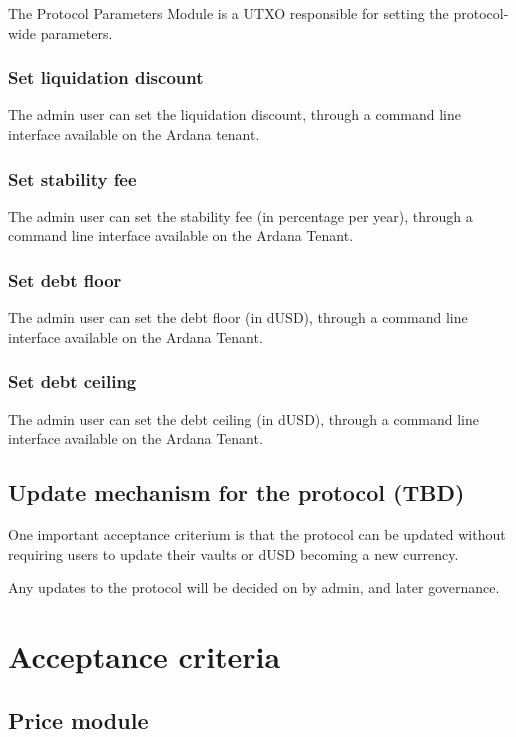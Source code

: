 \documentclass{article} %
\begin{document}
The Protocol Parameters Module is a UTXO responsible for setting the protocol-wide parameters.

\subsubsection*{Set liquidation discount}

The admin user can set the liquidation discount, through a command line
interface available on the Ardana tenant.

\subsubsection*{Set stability fee}

The admin user can set the stability fee (in percentage per year), through a
command line interface available on the Ardana Tenant.

\subsubsection*{Set debt floor}

The admin user can set the debt floor (in dUSD), through a command line
interface available on the Ardana Tenant.

\subsubsection*{Set debt ceiling}

The admin user can set the debt ceiling (in dUSD), through a command line
interface available on the Ardana Tenant.

\subsection{Update mechanism for the protocol (TBD)}

One important acceptance criterium is that the protocol can be updated without
requiring users to update their vaults or dUSD becoming a new currency.

Any updates to the protocol will be decided on by admin, and later governance.

\section{Acceptance criteria}

\subsection{Price module}
\end{document}
